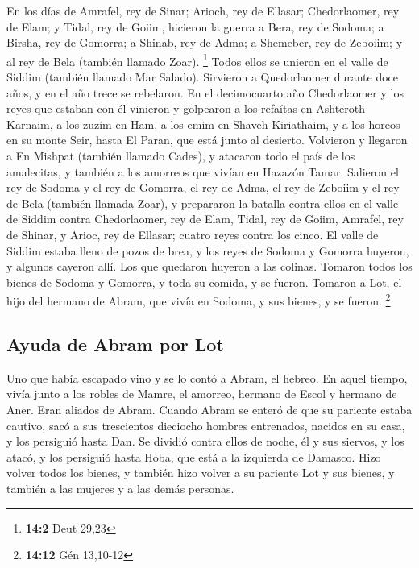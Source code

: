  En los días de Amrafel, rey de Sinar; Arioch, rey de
Ellasar; Chedorlaomer, rey de Elam; y Tidal, rey de Goiim,
 hicieron la guerra a Bera, rey de Sodoma; a Birsha, rey
de Gomorra; a Shinab, rey de Adma; a Shemeber, rey de Zeboiim; y al rey
de Bela (también llamado Zoar). \footnote{\textbf{14:2} Deut 29,23}
 Todos ellos se unieron en el valle de Siddim (también
llamado Mar Salado).  Sirvieron a Quedorlaomer durante
doce años, y en el año trece se rebelaron.  En el
decimocuarto año Chedorlaomer y los reyes que estaban con él vinieron y
golpearon a los refaítas en Ashteroth Karnaim, a los zuzim en Ham, a los
emim en Shaveh Kiriathaim,  y a los horeos en su monte
Seir, hasta El Paran, que está junto al desierto. 
Volvieron y llegaron a En Mishpat (también llamado Cades), y atacaron
todo el país de los amalecitas, y también a los amorreos que vivían en
Hazazón Tamar.  Salieron el rey de Sodoma y el rey de
Gomorra, el rey de Adma, el rey de Zeboiim y el rey de Bela (también
llamada Zoar), y prepararon la batalla contra ellos en el valle de
Siddim  contra Chedorlaomer, rey de Elam, Tidal, rey de
Goiim, Amrafel, rey de Shinar, y Arioc, rey de Ellasar; cuatro reyes
contra los cinco.  El valle de Siddim estaba lleno de
pozos de brea, y los reyes de Sodoma y Gomorra huyeron, y algunos
cayeron allí. Los que quedaron huyeron a las colinas. 
Tomaron todos los bienes de Sodoma y Gomorra, y toda su comida, y se
fueron.  Tomaron a Lot, el hijo del hermano de Abram, que
vivía en Sodoma, y sus bienes, y se fueron. \footnote{\textbf{14:12} Gén
  13,10-12}

\hypertarget{ayuda-de-abram-por-lot}{%
\subsection{Ayuda de Abram por Lot}\label{ayuda-de-abram-por-lot}}

 Uno que había escapado vino y se lo contó a Abram, el
hebreo. En aquel tiempo, vivía junto a los robles de Mamre, el amorreo,
hermano de Escol y hermano de Aner. Eran aliados de Abram.
 Cuando Abram se enteró de que su pariente estaba
cautivo, sacó a sus trescientos dieciocho hombres entrenados, nacidos en
su casa, y los persiguió hasta Dan.  Se dividió contra
ellos de noche, él y sus siervos, y los atacó, y los persiguió hasta
Hoba, que está a la izquierda de Damasco.  Hizo volver
todos los bienes, y también hizo volver a su pariente Lot y sus bienes,
y también a las mujeres y a las demás personas.

